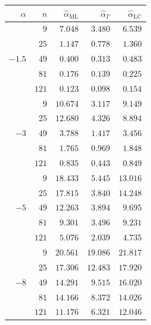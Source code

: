 \documentclass[10pt,a4paper]{article}
\begin{document}
\;
\begin{minipage}{0.5\linewidth}
\begin{tabular}{rrrrr}
	\toprule
	$\alpha$ & $n$ & $\widehat{\alpha}_{\text{ML}}$ & $\widehat{\alpha}_{\Gamma}$ & $\widehat{\alpha}_{\text{LC}}$\\  
	\midrule
	\multirow{5 }{*}{$-1.5$} 
	& $9$   & $7.048$ & $3.480$ & $6.539$ \\ 
	& $25$  & $1.147$ & $0.778$ & $1.360$ \\ 
	& $49$  & $0.400$ & $0.313$ & $0.483$ \\ 
	& $81$  & $0.176$ & $0.139$ & $0.225$ \\ 
	& $121$ & $0.123$ & $0.098$ & $0.154$ \\  
	\midrule
	\multirow{5 }{*}{$-3$}  
	& $9$   & $10.674$ & $3.117$ & $9.149$ \\ 
	& $25$  & $12.680$ & $4.326$ & $8.894$ \\ 
	& $49$  & $3.788$  & $1.417$ & $3.456$ \\ 
	& $81$  & $1.765$  & $0.969$ & $1.848$ \\ 
	& $121$ & $0.835$  & $0.443$ & $0.849$ \\  
	\midrule
	\multirow{5 }{*}{$-5$}  
	& $9$   & $18.433$ & $5.445$ & $13.016$ \\ 
	& $25$  & $17.815$ & $3.840$ & $14.248$ \\ 
	& $49$  & $12.263$ & $3.894$ & $9.695$  \\ 
	& $81$  & $9.301$  & $3.496$ & $9.231$  \\ 
	& $121$ & $5.076$  & $2.039$ & $4.735$  \\  
	\midrule
	\multirow{5 }{*}{$-8$}  
	& $9$   & $20.561$ & $19.086$ & $21.817$ \\ 
	& $25$  & $17.306$ & $12.483$ & $17.920$ \\ 
	& $49$  & $14.291$ & $9.515$  & $16.020$ \\ 
	& $81$  & $14.166$ & $8.372$  & $14.026$ \\ 
	& $121$ & $11.176$ & $6.321$  & $12.046$ \\ 
	\bottomrule
\end{tabular}
\end{minipage}

\vspace{0.5cm}
\end{document}
